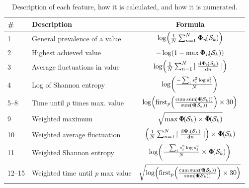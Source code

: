 \begin{table}[t]
\begin{adjustwidth*}{}{}
\small
\renewcommand{\arraystretch}{1.2}
\begin{threeparttable}
    \caption[Description of narcolepsy features]{Description of each feature, how it is calculated, and how it is numerated.}
    \label{tab:paperiii-supptable10}
    \begin{tabular}{@{}llc@{}} \toprule
        \textbf{\#} & \textbf{Description} & \textbf{Formula} \\ \midrule
        \num{1} & General prevalence of a value & \( \log \! \left( \frac{1}{N} \sum_{n=1}^{N}{\boldsymbol{\Phi}_{n} \! \! \left( \mathcal{S}_{k} \right)} \right) \) \\
        \num{2} & Highest achieved value & \( -\log \! \left( 1 - \max{\boldsymbol{\Phi}_{n} \! \! \left( \mathcal{S}_{k} \right)} \right) \) \\
        \num{3} & Average fluctuations in value & \( \log \! \left(  \frac{1}{N} \sum_{n=1}^{N}{ \mid \frac{ \mathrm{d} \boldsymbol{\Phi}_{n} \! \! \left( \mathcal{S}_{k} \right) }{ \mathrm{d} n } \mid } \right) \) \\
        \num{4} & Log of Shannon entropy & \( \log \! \left(  \frac{-\sum_{i} s_{i}^{2} \log s_{i}^{2}}{N}  \right) \) \\
        \numrange[range-phrase = --]{5}{8} & Time until \textit{p} times max. value & \( \log \! \parenthesis{\mathrm{first}_{p} \! \parenthesis{ \frac{ \mathrm{cum \, sum \! \parenthesis{ \boldsymbol{\Phi} \! \! \parenthesis{\mathcal{S}_{k}} }} }{ \mathrm{sum} \! \parenthesis{ \boldsymbol{\Phi} \! \! \parenthesis{\mathcal{S}_{k}} } } } \times 30} \) \\
        \num{9} & Weighted maximum & \( \sqrt{\max{ \boldsymbol{\Phi} \! \! \left( \mathcal{S}_{k} \right) } \times \bar{ \boldsymbol{\Phi}} \! \! \left( \mathcal{S}_{k} \right) } \) \\
        \num{10} & Weighted average fluctuation & \( \left(  \frac{1}{N} \sum_{n=1}^{N}{ \mid \frac{ \mathrm{d} \boldsymbol{\Phi}_{n} \! \! \left( \mathcal{S}_{k} \right) }{ \mathrm{d} n } \mid } \right) \times \bar{ \boldsymbol{\Phi}} \! \! \left( \mathcal{S}_{k} \right) \) \\
        \num{11} & Weighted Shannon entropy & \( \log \! \left(  \frac{-\sum_{i} s_{i}^{2} \log s_{i}^{2}}{N} \times \bar{ \boldsymbol{\Phi}} \! \! \left( \mathcal{S}_{k} \right)  \right) \) \\
        \numrange[range-phrase = --]{12}{15} & Weighted time until \textit{p} max value & \( \sqrt{ \log \! \parenthesis{\mathrm{first}_{p} \! \parenthesis{ \frac{ \mathrm{cum \, sum \! \parenthesis{ \boldsymbol{\Phi} \! \! \parenthesis{\mathcal{S}_{k}} }} }{ \mathrm{sum} \! \parenthesis{ \boldsymbol{\Phi} \! \! \parenthesis{\mathcal{S}_{k}} } } } \times 30} } \) \\

\end{tabular}
\end{threeparttable}
\end{adjustwidth*}
\end{table}
